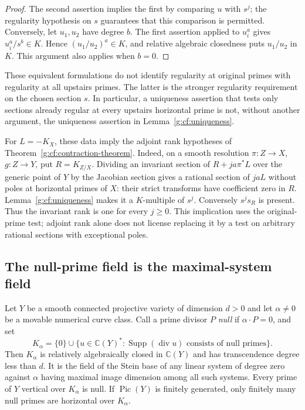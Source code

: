\begin{proof}
The second assertion implies the first by comparing $u$ with $s^j$;
the regularity hypothesis on $s$ guarantees that this comparison is
permitted. Conversely, let $u_1,u_2$ have degree $b$. The first assertion
applied to $u_i^a$ gives $u_i^a/s^b\in K$. Hence
$(u_1/u_2)^a\in K$, and relative algebraic closedness puts $u_1/u_2$ in
$K$. This argument also applies when $b=0$.
\end{proof}

These equivalent formulations do not identify regularity at original
primes with regularity at all upstairs primes. The latter is the stronger
regularity requirement on the chosen section $s$. In particular, a
uniqueness assertion that tests only sections already regular at every
upstairs horizontal prime is not, without another argument, the
uniqueness assertion in Lemma~\ref{g:cf:uniqueness}.

For $L=-K_X$, these data imply the adjoint rank hypotheses of
Theorem~\ref{g:cf:contraction-theorem}. Indeed, on a smooth resolution
$\pi:Z\to X$, $g:Z\to Y$, put $R=K_{Z/X}$. Dividing an invariant
section of $R+ja\pi^*L$ over the generic point of $Y$ by the Jacobian
section gives a rational section of $jaL$ without poles at horizontal
primes of $X$: their strict transforms have coefficient zero in $R$.
Lemma~\ref{g:cf:uniqueness} makes it a $K$-multiple of $s^j$.
Conversely $s^j s_R$ is present. Thus the invariant rank is one for
every $j\geq0$. This implication uses the original-prime test; adjoint
rank alone does not license replacing it by a test on arbitrary rational
sections with exceptional poles.

\subsection{The null-prime field is the maximal-system field}

\begin{lemma}\label{g:cf:null-field}
Let $Y$ be a smooth connected projective variety of dimension $d>0$ and
let $\alpha\ne0$ be a movable numerical curve class. Call a prime divisor
$P$ \emph{null} if $\alpha\cdot P=0$, and set
\[
 K_\alpha=\{0\}\cup\{u\in\mathbb C(Y)^*:
          \operatorname{Supp}(\operatorname{div}u)
          \text{ consists of null primes}\}.
\]
Then $K_\alpha$ is relatively algebraically closed in $\mathbb C(Y)$
and has transcendence degree less than $d$. It is the field of the Stein
base of any linear system of degree zero against $\alpha$ having maximal
image dimension among all such systems. Every prime of $Y$ vertical over
$K_\alpha$ is null. If $\operatorname{Pic}(Y)$ is finitely generated,
only finitely many null primes are horizontal over $K_\alpha$.
\end{lemma}

